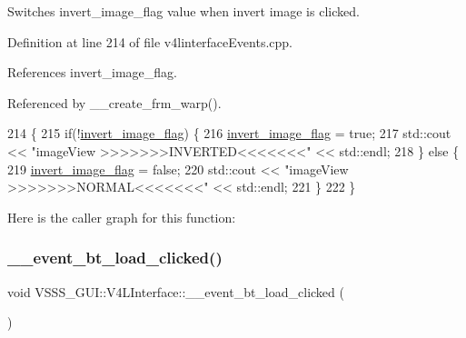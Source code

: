 Switches invert\+\_\+image\+\_\+flag value when \textquotesingle{}invert image\textquotesingle{} is clicked. 



Definition at line 214 of file v4linterface\+Events.\+cpp.



References invert\+\_\+image\+\_\+flag.



Referenced by \+\_\+\+\_\+create\+\_\+frm\+\_\+warp().


\begin{DoxyCode}
214                                                               \{
215         \textcolor{keywordflow}{if}(!\hyperlink{class_v_s_s_s___g_u_i_1_1_v4_l_interface_a5915fd3d7a8047e2c9cd331976acbbae}{invert\_image\_flag}) \{
216             \hyperlink{class_v_s_s_s___g_u_i_1_1_v4_l_interface_a5915fd3d7a8047e2c9cd331976acbbae}{invert\_image\_flag} = \textcolor{keyword}{true};
217             std::cout << \textcolor{stringliteral}{"imageView >>>>>>>INVERTED<<<<<<<"} << std::endl;
218         \} \textcolor{keywordflow}{else} \{
219             \hyperlink{class_v_s_s_s___g_u_i_1_1_v4_l_interface_a5915fd3d7a8047e2c9cd331976acbbae}{invert\_image\_flag} = \textcolor{keyword}{false};
220             std::cout << \textcolor{stringliteral}{"imageView >>>>>>>NORMAL<<<<<<<"} << std::endl;
221         \}
222     \}
\end{DoxyCode}
Here is the caller graph for this function\+:
\mbox{\label{class_v_s_s_s___g_u_i_1_1_v4_l_interface_a62894fc8a49716b44d3a3c6a445fe880}} 
\subsubsection{\texorpdfstring{\+\_\+\+\_\+event\+\_\+bt\+\_\+load\+\_\+clicked()}{\_\_event\_bt\_load\_clicked()}}
{\footnotesize\ttfamily void V\+S\+S\+S\+\_\+\+G\+U\+I\+::\+V4\+L\+Interface\+::\+\_\+\+\_\+event\+\_\+bt\+\_\+load\+\_\+clicked (\begin{DoxyParamCaption}{ }\end{DoxyParamCaption})}



